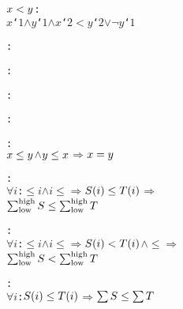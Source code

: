 \begin{alltt}
  \(\xunderscorelttwofn{x}{y}\):  \pvskey{=}
      \pvsid{(}\(x\)`\(1\) \(\wedge\) \(y\)`\(1\) \(\wedge\) \(x\)`\(2\) \(<\) \(y\)`\(2\)\pvsid{)} \(\vee\) \pvsid{(}\(\neg\) \(y\)`\(1\)\pvsid{)}\vspace*{\pvsdeclspacing}

  :  \pvsid{(}\pvsid{)}\vspace*{\pvsdeclspacing}

  :  \pvsid{(}\pvsid{)}\vspace*{\pvsdeclspacing}

  :  \pvsid{(}\pvsid{)}\vspace*{\pvsdeclspacing}

  :  \pvsid{(}\pvsid{)}\vspace*{\pvsdeclspacing}

  : 
    \(\xunderscoreletwofn{x}{y}\) \(\wedge\) \(\xunderscoreletwofn{y}{x}\) \(\Rightarrow\) \(\xunderscoreeqtwofn{x}{y}\)\vspace*{\pvsdeclspacing}

  : 
    \pvsid{(}\(\forall\) \(i\):  \(\leq\) \(i\) \(\wedge\) \(i\) \(\leq\)  \(\Rightarrow\) \(\xunderscoreletwofn{S\pvsid{(}i\pvsid{)}}{T\pvsid{(}i\pvsid{)}}\)\pvsid{)} \(\Rightarrow\)
     \(\xunderscoreletwofn{\xunderscoresigmathreefn{\pvsid{low}}{\pvsid{high}}{S}}{\xunderscoresigmathreefn{\pvsid{low}}{\pvsid{high}}{T}}\)\vspace*{\pvsdeclspacing}

  : 
    \pvsid{(}\(\forall\) \(i\):  \(\leq\) \(i\) \(\wedge\) \(i\) \(\leq\)  \(\Rightarrow\) \(\xunderscorelttwofn{S\pvsid{(}i\pvsid{)}}{T\pvsid{(}i\pvsid{)}}\)\pvsid{)} \(\wedge\)  \(\leq\)  \(\Rightarrow\)
     \(\xunderscorelttwofn{\xunderscoresigmathreefn{\pvsid{low}}{\pvsid{high}}{S}}{\xunderscoresigmathreefn{\pvsid{low}}{\pvsid{high}}{T}}\)\vspace*{\pvsdeclspacing}

  : 
    \pvsid{(}\(\forall\) \(i\): \(\xunderscoreletwofn{S\pvsid{(}i\pvsid{)}}{T\pvsid{(}i\pvsid{)}}\)\pvsid{)} \(\Rightarrow\) \(\xunderscoreletwofn{\xunderscoresumonefn{S}}{\xunderscoresumonefn{T}}\)\vspace*{\pvsdeclspacing}


\end{alltt}
